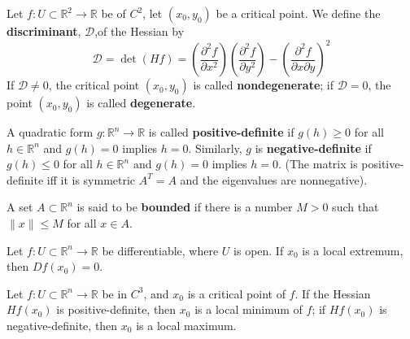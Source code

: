 \documentclass[openany]{book}
\newcommand{\R}{\mathbb{R}}
\begin{document}
\begin{defn}
    Let $f:U\subset\R^2\to\R$ be of $C^2$, let $(x_0,y_0)$ be a critical point. We define the \textbf{discriminant}, \boldmath $\mathcal{D}$,\unboldmath of the Hessian by
    \begin{equation*}
        \mathcal{D}=\det (Hf)=\left(\frac{\partial^2f}{\partial x^2}\right)\left(\frac{\partial^2f}{\partial y^2}\right)-\left(\frac{\partial^2f}{\partial x\partial y}\right)^2
    \end{equation*}
    If $\mathcal{D}\neq 0$, the critical point $(x_0,y_0)$ is called \textbf{nondegenerate}; if $\mathcal{D}=0$, the point $(x_0,y_0)$ is called \textbf{degenerate}.
\end{defn}

\begin{defn}
    A quadratic form $g:\R^n\to\R$ is called \textbf{positive-definite} if $g(h)\geq 0$ for all $h\in\R^n$ and $g(h)=0$ implies $h=0$. Similarly, $g$ is \textbf{negative-definite} if $g(h)\leq 0$ for all $h\in\R^n$ and $g(h)=0$ implies $h=0$. (The matrix is positive-definite iff it is symmetric $A^T=A$ and the eigenvalues are nonnegative).
\end{defn}



\begin{defn}
    A set $A\subset\R^n$ is said to be \textbf{bounded} if there is a number $M>0$ such that $\|x\|\leq M$ for all $x\in A$. 
\end{defn}




\begin{prop}
    Let $f:U\subset\R^n\to\R$ be differentiable, where $U$ is open. If $x_0$ is a local extremum, then $Df(x_0)=0$. 
\end{prop}


\begin{prop}[extremum]
    Let $f\colon U\subset\R^n\to\R$ be in $C^3$, and $x_0$ is a critical point of $f$. If the Hessian $Hf(x_0)$ is positive-definite, then $x_0$ is a local minimum of $f$; if $Hf(x_0)$ is negative-definite, then $x_0$ is a local maximum.
\end{prop}
\end{document}
